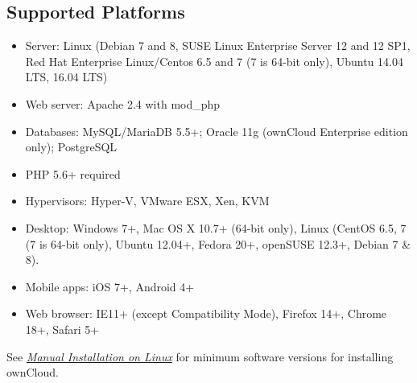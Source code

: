 \documentclass[letterpaper,10pt,english]{sphinxmanual}
\begin{document}
\subsection{Supported Platforms}
\label{installation/system_requirements:supported-platforms}\begin{itemize}
\item {} 
Server: Linux (Debian 7 and 8, SUSE Linux Enterprise Server 12 and 12 SP1, Red Hat Enterprise Linux/Centos 6.5 and 7 (7 is 64-bit only), Ubuntu 14.04 LTS, 16.04 LTS)

\item {} 
Web server: Apache 2.4 with mod\_php

\item {} 
Databases: MySQL/MariaDB 5.5+; Oracle 11g (ownCloud Enterprise edition only); PostgreSQL

\item {} 
PHP 5.6+ required

\item {} 
Hypervisors: Hyper-V, VMware ESX, Xen, KVM

\item {} 
Desktop: Windows 7+, Mac OS X 10.7+ (64-bit
only), Linux (CentOS 6.5, 7 (7 is 64-bit only), Ubuntu 12.04+, Fedora 20+, openSUSE 12.3+, Debian 7 \& 8).

\item {} 
Mobile apps: iOS 7+, Android 4+

\item {} 
Web browser: IE11+ (except Compatibility Mode), Firefox 14+, Chrome 18+,
Safari 5+

\end{itemize}

See {\hyperref[installation/source_installation::doc]{\emph{\emph{Manual Installation on Linux}}}} for minimum software versions for installing
ownCloud.
\end{document}
